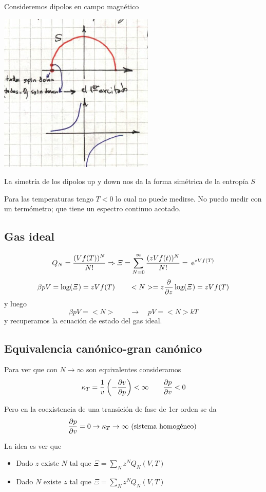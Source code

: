 \documentclass[10pt,oneside]{CBFT_book}
\begin{document}
Consideremos dipolos en campo magnético

\includegraphics[scale=0.5]{images/1606329322.jpg}

La simetría de los dipolos up y down nos da la forma simétrica de la entropía $S$

Para las temperaturas tengo $T<0$ lo cual no puede medirse. No puedo medir con un termómetro; que
tiene un espectro continuo acotado.


\subsection{Gas ideal}

\[
	Q_N = \frac{(Vf(T))^N}{N!} \Rightarrow \Xi = \sum_{N=0}^\infty \frac{(zVf(t))^N}{N!} = \:\mathrm{e}^{zVf(T)}
\]
\[
	\beta pV = \log (\Xi) = zVf(T) \qquad <N> = z \frac{\partial^{\hspace{-0.05em}} {}}{\partial {z}^{\hspace{-0.05em}}} \log (\Xi) = zVf(T)
\]
y luego 
\[
	\beta pV = <N> \qquad \rightarrow \quad pV = <N> k T
\]
y recuperamos la ecuación de estado del gas ideal.


\subsection{Equivalencia canónico-gran canónico}

Para ver que con $ N \to \infty $ son equivalentes consideramos 
\[
	\kappa_T = \frac{1}{v} \left( -\frac{\partial^{\hspace{-0.05em}} {v}}{\partial {p}^{\hspace{-0.05em}}} \right) < \infty \qquad \frac{\partial^{\hspace{-0.05em}} {p}}{\partial {v}^{\hspace{-0.05em}}} < 0
\]

Pero en la coexistencia de una transición de fase de 1er orden se da 
\[
	\frac{\partial^{\hspace{-0.05em}} {p}}{\partial {v}^{\hspace{-0.05em}}} = 0  \rightarrow \kappa_T \to \infty \text{ (sistema homogéneo) }
\]

La idea es ver que 
\begin{itemize}
 \item Dado $z$ existe $N$ tal que $ \Xi = \sum_N z^N Q_N(V,T) $
 \item Dado $N$ existe $z$ tal que $ \Xi = \sum_N z^N Q_N(V,T) $
\end{itemize}
\end{document}
